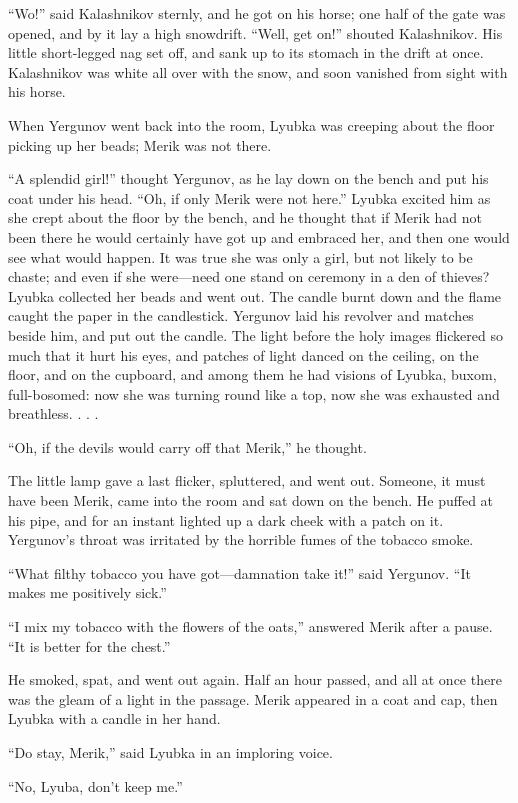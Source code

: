 “Wo!” said Kalashnikov sternly, and he got on his horse; one half of the
gate was opened, and by it lay a high snowdrift. “Well, get on!” shouted
Kalashnikov. His little short-legged nag set off, and sank up to its
stomach in the drift at once. Kalashnikov was white all over with the
snow, and soon vanished from sight with his horse.

When Yergunov went back into the room, Lyubka was creeping about the
floor picking up her beads; Merik was not there.

“A splendid girl!” thought Yergunov, as he lay down on the bench and put
his coat under his head. “Oh, if only Merik were not here.” Lyubka
excited him as she crept about the floor by the bench, and he thought
that if Merik had not been there he would certainly have got up and
embraced her, and then one would see what would happen. It was true she
was only a girl, but not likely to be chaste; and even if she were—need
one stand on ceremony in a den of thieves? Lyubka collected her beads
and went out. The candle burnt down and the flame caught the paper in
the candlestick. Yergunov laid his revolver and matches beside him, and
put out the candle. The light before the holy images flickered so much
that it hurt his eyes, and patches of light danced on the ceiling, on
the floor, and on the cupboard, and among them he had visions of Lyubka,
buxom, full-bosomed: now she was turning round like a top, now she was
exhausted and breathless. . . .

“Oh, if the devils would carry off that Merik,” he thought.

The little lamp gave a last flicker, spluttered, and went out. Someone,
it must have been Merik, came into the room and sat down on the bench.
He puffed at his pipe, and for an instant lighted up a dark cheek with a
patch on it. Yergunov’s throat was irritated by the horrible fumes of
the tobacco smoke.

“What filthy tobacco you have got—damnation take it!” said Yergunov. “It
makes me positively sick.”

“I mix my tobacco with the flowers of the oats,” answered Merik after a
pause. “It is better for the chest.”

He smoked, spat, and went out again. Half an hour passed, and all at
once there was the gleam of a light in the passage. Merik appeared in a
coat and cap, then Lyubka with a candle in her hand.

“Do stay, Merik,” said Lyubka in an imploring voice.

“No, Lyuba, don’t keep me.”

